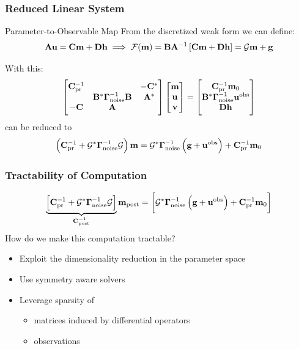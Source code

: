 \documentclass[
  pdf,
  10pt,
  xcolor={svgnames},
]{beamer}
\newcommand{\mc}[1]{\mathcal{#1}}
\newcommand{\mat}[1]{\mathbf{{#1}}}
\newcommand{\obs}{\mathbf{u}^{\rm obs}}
\begin{document}
\begin{frame}
  \frametitle{Reduced Linear System}
  \begin{block}{Parameter-to-Observable Map}
    From the discretized weak form we can define:
    \[
      \mat{A}\vb{u} = \mat{C} \vb{m} + \mat{D} \vb{h}
      \implies
      \mc{F}(\vb{m}) = \mat{B} \mat{A}^{-1} \left[
        \mat{C} \vb{m} + \mat{D} \vb{h}
      \right]
      = \mc{G} \vb{m} + \vb{g}
    \]
  \end{block}
  \pause
  With this:
  \[
    \begin{bmatrix}
      \mat{C}_{\rm pr}^{-1} & & -\mat{C}^* \\
       & \mat{B}^* \vb{\Gamma}_{\rm noise}^{-1} \mat{B} & \mat{A}^* \\
      -\mat{C} & \mat{A} & 
    \end{bmatrix}
    \begin{bmatrix} \vb{m} \\ \vb{u} \\ \vb{v} \end{bmatrix}
    = \begin{bmatrix}
      \mat{C}_{\rm pr}^{-1} \vb{m}_0 \\ 
      \mat{B}^* \vb{\Gamma}_{\rm noise}^{-1} \obs \\
      \mat{D} \vb{h}
    \end{bmatrix}
  \]
  can be reduced to
  \[
    \left(
      \mat{C}_{\rm pr}^{-1} + \mc{G}^* \vb{\Gamma}_{\rm noise}^{-1} \mc{G}
    \right)\vb{m}
    = \mc{G}^* \vb{\Gamma}_{\rm noise}^{-1} \left( \vb{g} + \obs \right)
    + \mat{C}_{\rm pr}^{-1} \vb{m}_0
  \]
\end{frame}

\begin{frame}
  \frametitle{Tractability of Computation}
  \[
    \underbrace{\left[
        \mat{C}_{\rm pr}^{-1} + \mc{G}^* \vb{\Gamma}_{\rm noise}^{-1} \mc{G}
    \right]}_{\mat{C}_{\rm post}^{-1}}
    \vb{m}_{\rm post}
    =
    \left[
      \mc{G}^* \vb{\Gamma}_{\rm noise}^{-1} \left( \vb{g} + \obs \right)
      + \mat{C}_{\rm pr}^{-1} \vb{m}_0
    \right]
  \]
  How do we make this computation tractable?
  \pause
  \begin{itemize}
    \item Exploit the dimensionality reduction in the parameter space
    \item Use symmetry aware solvers
    \item Leverage sparsity of 
      \begin{itemize}
        \item matrices induced by differential operators
        \item observations
      \end{itemize}
  \end{itemize}
\end{frame}
\end{document}
